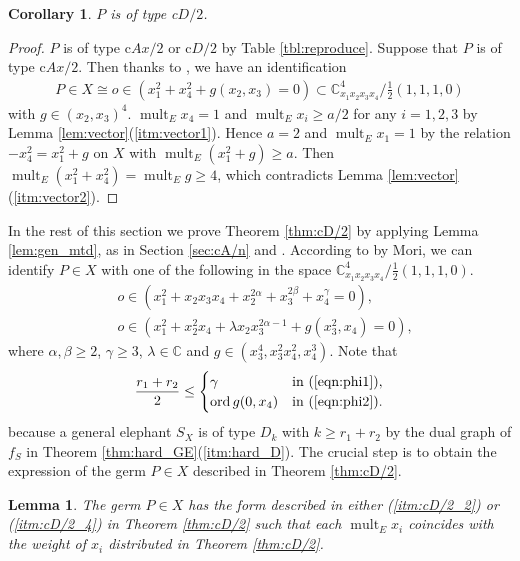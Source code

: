 \documentclass[a4paper,11pt]{amsart}
\newtheorem{lemma}[theorem]{Lemma}
\newtheorem{corollary}[theorem]{Corollary}
\theoremstyle{definition}
\theoremstyle{remark}
\numberwithin{equation}{section}
\newcommand{\bC}{{\mathbb C}}
\newcommand{\mult}{\operatorname{mult}}
\newcommand{\ord}{\operatorname{ord}}
\begin{document}
\begin{corollary}\label{cor:cD/2}
$P$ is of type c$D/2$.
\end{corollary}

\begin{proof}
$P$ is of type c$Ax/2$ or c$D/2$ by Table \ref{tbl:reproduce}.
Suppose that $P$ is of type c$Ax/2$.
Then thanks to \cite{Mo85},
we have an identification
\begin{align*}
P \in X \cong o \in (x_1^2+x_4^2+g(x_2,x_3)=0)
\subset \bC^4_{x_1x_2x_3x_4}/\frac{1}{2}(1,1,1,0)
\end{align*}
with $g\in(x_2,x_3)^4$.
$\mult_E x_4=1$ and $\mult_E x_i\ge a/2$ for any $i=1,2,3$
by Lemma \ref{lem:vector}(\ref{itm:vector1}).
Hence $a=2$ and $\mult_E x_1=1$
by the relation $-x_4^2=x_1^2+g$ on $X$ with $\mult_E(x_1^2+g) \ge a$.
Then $\mult_E(x_1^2+x_4^2)=\mult_E g \ge 4$,
which contradicts Lemma \ref{lem:vector}(\ref{itm:vector2}).
\end{proof}

In the rest of this section
we prove Theorem \ref{thm:cD/2} by applying Lemma \ref{lem:gen_mtd},
as in Section \ref{sec:cA/n} and \cite[Section 6]{Ka03}.
According to \cite[Remark 23.1]{Mo85} by Mori,
we can identify $P \in X$ with one of the following
in the space $\bC^4_{x_1x_2x_3x_4} /\frac{1}{2}(1,1,1,0)$.
\begin{align}
&o \in (x_1^2+x_2x_3x_4+x_2^{2\alpha}+x_3^{2\beta}+x_4^\gamma=0),
\label{eqn:phi1} \\
&o \in (x_1^2+x_2^2x_4+\lambda x_2x_3^{2\alpha-1}+g(x_3^2,x_4)=0),
\label{eqn:phi2}
\end{align}
where $\alpha, \beta\ge2$, $\gamma\ge3$,
$\lambda \in \bC$ and $g \in (x_3^4,x_3^2x_4^2,x_4^3)$.
Note that
\begin{align}\label{eqn:ord_estimate}
\frac{r_1+r_2}{2} \le
\begin{cases}
\gamma        & \textrm{in (\ref{eqn:phi1})},\\
\ord g(0,x_4) & \textrm{in (\ref{eqn:phi2})}.
\end{cases}
\end{align}
because a general elephant $S_X$ is of type $D_k$
with $k \ge r_1+r_2$ by the dual graph of $f_S$
in Theorem \ref{thm:hard_GE}(\ref{itm:hard_D}).
The crucial step is to obtain the expression of the germ $P \in X$
described in Theorem \ref{thm:cD/2}.

\begin{lemma}\label{lem:description}
The germ $P \in X$ has the form described in
either \textup{(\ref{itm:cD/2_2})} or \textup{(\ref{itm:cD/2_4})}
in Theorem \textup{\ref{thm:cD/2}}
such that each $\mult_E x_i$ coincides with the weight of $x_i$
distributed in Theorem \textup{\ref{thm:cD/2}}.
\end{lemma}
\end{document}
